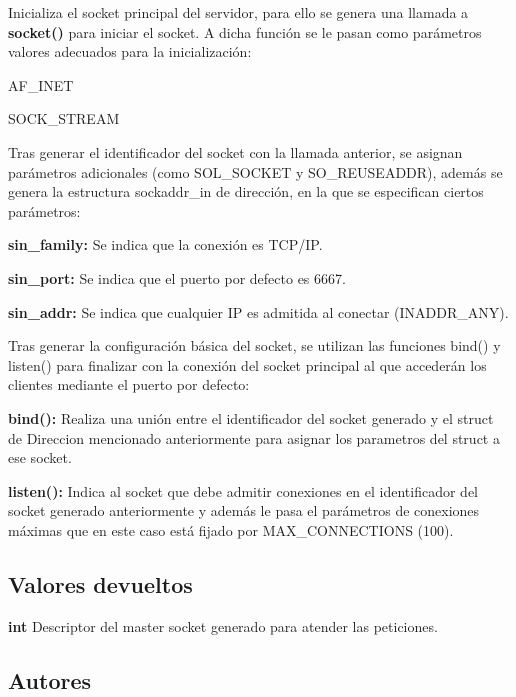 Inicializa el socket principal del servidor, para ello se genera una llamada a {\bfseries socket()} para iniciar el socket. A dicha función se le pasan como parámetros valores adecuados para la inicialización\+: 
\begin{DoxyItemize}
\item A\+F\+\_\+\+I\+N\+ET 
\item S\+O\+C\+K\+\_\+\+S\+T\+R\+E\+AM 
\end{DoxyItemize}Tras generar el identificador del socket con la llamada anterior, se asignan parámetros adicionales (como S\+O\+L\+\_\+\+S\+O\+C\+K\+ET y S\+O\+\_\+\+R\+E\+U\+S\+E\+A\+D\+DR), además se genera la estructura sockaddr\+\_\+in de dirección, en la que se especifican ciertos parámetros\+: 
\begin{DoxyItemize}
\item {\bfseries sin\+\_\+family\+:} Se indica que la conexión es T\+C\+P/\+IP. 
\item {\bfseries sin\+\_\+port\+:} Se indica que el puerto por defecto es 6667. 
\item {\bfseries sin\+\_\+addr\+:} Se indica que cualquier IP es admitida al conectar (I\+N\+A\+D\+D\+R\+\_\+\+A\+NY). 
\end{DoxyItemize}Tras generar la configuración básica del socket, se utilizan las funciones bind() y listen() para finalizar con la conexión del socket principal al que accederán los clientes mediante el puerto por defecto\+: 
\begin{DoxyItemize}
\item {\bfseries bind()\+:} Realiza una unión entre el identificador del socket generado y el struct de Direccion mencionado anteriormente para asignar los parametros del struct a ese socket. 
\item {\bfseries listen()\+:} Indica al socket que debe admitir conexiones en el identificador del socket generado anteriormente y además le pasa el parámetros de conexiones máximas que en este caso está fijado por M\+A\+X\+\_\+\+C\+O\+N\+N\+E\+C\+T\+I\+O\+NS (100). 
\end{DoxyItemize}\hypertarget{server_start_return2}{}\subsection{Valores devueltos}\label{server_start_return2}

\begin{DoxyItemize}
\item {\bfseries int} Descriptor del master socket generado para atender las peticiones. 
\end{DoxyItemize}\hypertarget{server_start_authors2}{}\subsection{Autores}\label{server_start_authors2}

